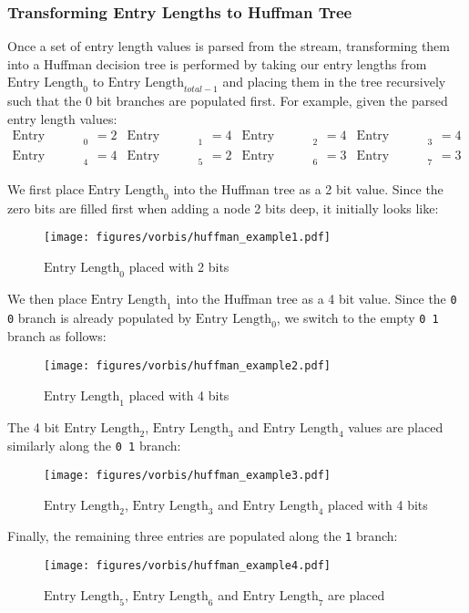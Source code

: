 \clearpage

\subsubsection{Transforming Entry Lengths to Huffman Tree}

Once a set of entry length values is parsed from the stream,
transforming them into a Huffman decision tree
is performed by taking our entry lengths from
$\text{Entry Length}_0$ to $\text{Entry Length}_{total - 1}$
and placing them in the tree recursively such that the 0 bit
branches are populated first.
For example, given the parsed entry length values:
\begin{align*}
\text{Entry Length}_0 &= 2 & \text{Entry Length}_1 &= 4 & \text{Entry Length}_2 &= 4 & \text{Entry Length}_3 &= 4 \\
\text{Entry Length}_4 &= 4 & \text{Entry Length}_5 &= 2 & \text{Entry Length}_6 &= 3 & \text{Entry Length}_7 &= 3
\end{align*}
\par
\noindent
We first place $\text{Entry Length}_0$ into the Huffman tree as a 2 bit value.
Since the zero bits are filled first when adding a node 2 bits deep,
it initially looks like:

\begin{figure}[h]
\texttt{[image: figures/vorbis/huffman\_example1.pdf]}
\caption{$\text{Entry Length}_0$ placed with 2 bits}
\end{figure}
\par
\noindent
We then place $\text{Entry Length}_1$ into the Huffman tree as a 4 bit value.
Since the \texttt{0 0} branch is already populated by $\text{Entry Length}_0$,
we switch to the empty \texttt{0 1} branch as follows:
\begin{figure}[h]
\texttt{[image: figures/vorbis/huffman\_example2.pdf]}
\caption{$\text{Entry Length}_1$ placed with 4 bits}
\end{figure}
\par
\noindent
The 4 bit $\text{Entry Length}_2$, $\text{Entry Length}_3$ and $\text{Entry Length}_4$
values are placed similarly along the \texttt{0 1} branch:
\begin{figure}[h]
\texttt{[image: figures/vorbis/huffman\_example3.pdf]}
\caption{$\text{Entry Length}_2$, $\text{Entry Length}_3$ and $\text{Entry Length}_4$ placed with 4 bits}
\end{figure}
\par
\noindent
Finally, the remaining three entries are populated along the \texttt{1} branch:
\begin{figure}[h]
\texttt{[image: figures/vorbis/huffman\_example4.pdf]}
\caption{$\text{Entry Length}_5$, $\text{Entry Length}_6$ and $\text{Entry Length}_7$ are placed}
\end{figure}

